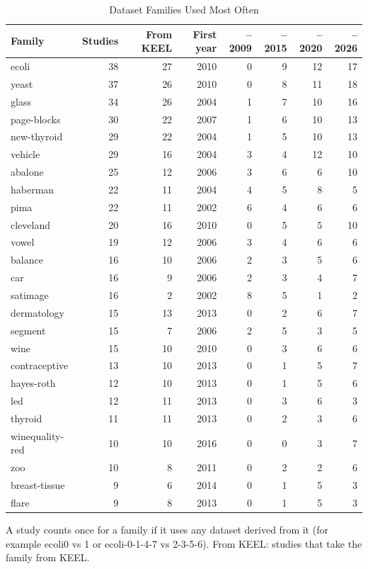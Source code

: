 \begin{table}[t]
  \caption{Dataset Families Used Most Often}
  \label{tab:empirical-datafam}
  \footnotesize
  \setlength{\tabcolsep}{4pt}
  \begin{tabular}{@{}lrrrrrrr@{}}
    \toprule
    Family & Studies & From KEEL & First year & --2009 & --2015 & --2020 & --2026\\
    \midrule
    ecoli & 38 & 27 & 2010 & 0 & 9 & 12 & 17\\
    yeast & 37 & 26 & 2010 & 0 & 8 & 11 & 18\\
    glass & 34 & 26 & 2004 & 1 & 7 & 10 & 16\\
    page-blocks & 30 & 22 & 2007 & 1 & 6 & 10 & 13\\
    new-thyroid & 29 & 22 & 2004 & 1 & 5 & 10 & 13\\
    vehicle & 29 & 16 & 2004 & 3 & 4 & 12 & 10\\
    abalone & 25 & 12 & 2006 & 3 & 6 & 6 & 10\\
    haberman & 22 & 11 & 2004 & 4 & 5 & 8 & 5\\
    pima & 22 & 11 & 2002 & 6 & 4 & 6 & 6\\
    cleveland & 20 & 16 & 2010 & 0 & 5 & 5 & 10\\
    vowel & 19 & 12 & 2006 & 3 & 4 & 6 & 6\\
    balance & 16 & 10 & 2006 & 2 & 3 & 5 & 6\\
    car & 16 & 9 & 2006 & 2 & 3 & 4 & 7\\
    satimage & 16 & 2 & 2002 & 8 & 5 & 1 & 2\\
    dermatology & 15 & 13 & 2013 & 0 & 2 & 6 & 7\\
    segment & 15 & 7 & 2006 & 2 & 5 & 3 & 5\\
    wine & 15 & 10 & 2010 & 0 & 3 & 6 & 6\\
    contraceptive & 13 & 10 & 2013 & 0 & 1 & 5 & 7\\
    hayes-roth & 12 & 10 & 2013 & 0 & 1 & 5 & 6\\
    led & 12 & 11 & 2013 & 0 & 3 & 6 & 3\\
    thyroid & 11 & 11 & 2013 & 0 & 2 & 3 & 6\\
    winequality-red & 10 & 10 & 2016 & 0 & 0 & 3 & 7\\
    zoo & 10 & 8 & 2011 & 0 & 2 & 2 & 6\\
    breast-tissue & 9 & 6 & 2014 & 0 & 1 & 5 & 3\\
    flare & 9 & 8 & 2013 & 0 & 1 & 5 & 3\\
    \bottomrule
  \end{tabular}
  \par\smallskip\raggedright\scriptsize A study counts once for a family if it uses any dataset derived from it (for example ecoli0 vs 1 or ecoli-0-1-4-7 vs 2-3-5-6). From KEEL: studies that take the family from KEEL.
\end{table}
